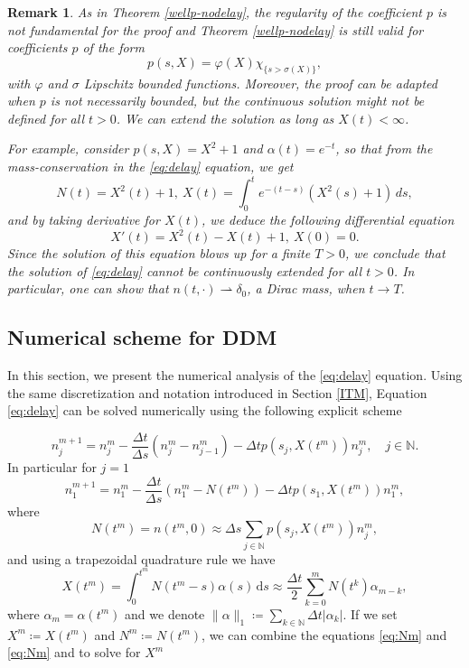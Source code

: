 \documentclass[11pt,a4paper]{article}
\newcommand{\N}{\mathbb{N}}
\newcommand{\dd}{\mathrm{d}}
\newtheorem{remark}{Remark}[section]
\begin{document}
\begin{remark}
    As in Theorem \ref{wellp-nodelay}, the regularity of the coefficient $p$ is not fundamental for the proof and Theorem \ref{wellp-nodelay} is still valid for coefficients $p$ of the form
    \begin{equation*}
    p(s,X)=\varphi(X)\chi_{\{s>\sigma(X)\}},      
    \end{equation*}
    with $\varphi$ and $\sigma$ Lipschitz bounded functions. Moreover, the proof can be adapted when $p$ is not necessarily bounded, but the continuous solution might not be defined for all $t>0$. We can extend the solution as long as $X(t)<\infty$.

    For example, consider $p(s,X)=X^2+1$ and $\alpha(t)=e^{-t}$, so that from the mass-conservation in the \eqref{eq:delay} equation, we get
    \begin{equation*}
    N(t)=X^2(t)+1,\:X(t)=\int_0^t e^{-(t-s)}(X^2(s)+1)\,ds,
    \end{equation*}
    and by taking derivative for $X(t)$, we deduce the following differential equation
    \begin{equation*}
    X'(t)=X^2(t)-X(t)+1,\: X(0)=0.
    \end{equation*}
    Since the solution of this equation blows up for a finite $T>0$, we conclude that the solution of \eqref{eq:delay} cannot be  continuously extended for all $t>0$. In particular, one can show that $n(t,\cdot)\rightharpoonup\delta_0$, a Dirac mass, when $t\to T$.
    \end{remark}

\subsection{Numerical scheme for DDM}
In this section, we present the numerical analysis of the \eqref{eq:delay} equation. Using the same discretization and notation introduced in Section \ref{ITM}, Equation \eqref{eq:delay} can be solved numerically using the following explicit scheme

\begin{equation}\label{eq:nn}
    n_j^{m+1}=n_j^m-\frac{\Delta t}{\Delta s}(n_{j}^m-n_{j-1}^m)-\Delta t p(s_j,X(t^m))n_j^m,\quad j\in\N.
\end{equation}
In particular for $j=1$
\begin{equation*} 
    n_1^{m+1}=n_1^m-\frac{\Delta t}{\Delta s}(n_{1}^m-N(t^m))-\Delta t p(s_1,X(t^m))n_1^m, 
\end{equation*}
where 
\begin{equation}\label{eq:Nm}
    N(t^m)=n(t^m,0)\approx \Delta s \sum_{j\in\N} p(s_j,X(t^m))n_j^m,
\end{equation}
and using a trapezoidal quadrature rule we have
\begin{equation}\label{eq:Xm}
    X(t^m)=\int_0^{t^m} N(t^m-s)\alpha(s)\,\dd s\approx \frac{\Delta t}{2} \sum_{k=0}^m N(t^k)\alpha_{m-k},
\end{equation}
where $\alpha_{m}=\alpha(t^m)$ and we denote $\|\alpha\|_1\coloneqq\sum_{k\in\N}\Delta t|\alpha_k|$. If we set $X^m\coloneqq X(t^m)$ and $N^m\coloneqq N(t^m)$, we can combine the equations \eqref{eq:Nm} and \eqref{eq:Nm} and to solve for $X^m$
\end{document}
